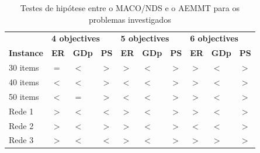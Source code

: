 \begin{table}[htb]
	\centering
	\def\arraystretch{1.0}
	\caption{Testes de hipótese entre o MACO/NDS e o AEMMT para os problemas investigados}
	\label{tab_ztest_meamt}
	\begin{tabular}{llllllllll}
		& \multicolumn{3}{l}{\textbf{4 objectives}} & \multicolumn{3}{l}{\textbf{5 objectives}} & \multicolumn{3}{l}{\textbf{6 objectives
		}} \\
		\textbf{Instance} & \textbf{ER} & \textbf{GDp} & \textbf{PS} & \textbf{ER} & \textbf{GDp} & \textbf{PS} & \textbf{ER} & \textbf{GDp} & \textbf{PS} \\ \hline
		30 items & \cellcolor{white} $=$ & \cellcolor{table-green} $<$ & \cellcolor{table-green} $>$ & \cellcolor{table-red} $>$ & \cellcolor{table-green} $<$ & \cellcolor{table-green} $>$ & \cellcolor{table-red} $>$ & \cellcolor{table-green} $<$ & \cellcolor{table-green} $>$ \\
		40 items & \cellcolor{table-green} $<$ & \cellcolor{table-green} $<$ & \cellcolor{table-green} $>$ & \cellcolor{table-green} $<$ & \cellcolor{table-green} $<$ & \cellcolor{table-green} $>$ & \cellcolor{table-red} $>$ & \cellcolor{table-green} $<$ & \cellcolor{table-green} $>$ \\
		50 items & \cellcolor{table-green} $<$ & \cellcolor{white} $=$ & \cellcolor{table-green} $>$ & \cellcolor{table-green} $<$ & \cellcolor{table-green} $<$ & \cellcolor{table-green} $>$ & \cellcolor{table-red} $>$ & \cellcolor{table-green} $<$ & \cellcolor{table-green} $>$ \\  \hline 
		Rede 1 & \cellcolor{table-red} $>$ & \cellcolor{table-green} $<$ & \cellcolor{table-red} $<$ & \cellcolor{table-red} $>$ & \cellcolor{table-green} $<$ & \cellcolor{table-green} $>$ & \cellcolor{table-red} $>$ & \cellcolor{table-green} $<$ & \cellcolor{table-green} $>$ \\
		Rede 2 & \cellcolor{table-red} $>$ & \cellcolor{table-green} $<$ & \cellcolor{table-green} $>$ & \cellcolor{table-red} $>$ & \cellcolor{table-green} $<$ & \cellcolor{table-green} $>$ & \cellcolor{table-green} $<$ & \cellcolor{table-green} $<$ & \cellcolor{table-green} $>$ \\
		Rede 3 & \cellcolor{table-red} $>$ & \cellcolor{table-green} $<$ & \cellcolor{table-red} $<$ & \cellcolor{table-red} $>$ & \cellcolor{table-green} $<$ & \cellcolor{table-green} $>$ & \cellcolor{table-red} $>$ & \cellcolor{table-red} $>$ & \cellcolor{table-green} $>$ \\  \hline 
	\end{tabular}
\end{table}

